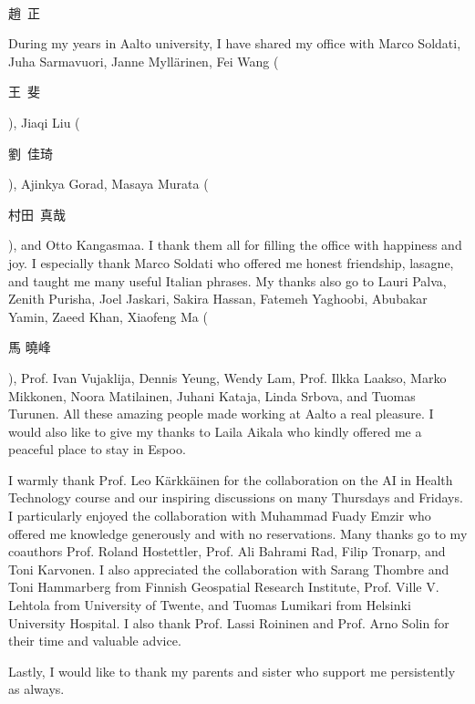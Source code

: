 \begin{preface}[Helsinki]{\large{\begin{CJK}{UTF8}{bkai}\\趙~正\end{CJK}}
}
During my years in Aalto university, I have shared my office with Marco Soldati, Juha Sarmavuori, Janne Myll\"{a}rinen, Fei Wang (\begin{CJK}{UTF8}{bkai}王~斐\end{CJK}), Jiaqi Liu (\begin{CJK}{UTF8}{bkai}劉~佳琦\end{CJK}), Ajinkya Gorad, Masaya Murata (\begin{CJK}{UTF8}{bkai}村田~真哉\end{CJK}), and Otto Kangasmaa. I thank them all for filling the office with happiness and joy. I especially thank Marco Soldati who offered me honest friendship, lasagne, and taught me many useful Italian phrases. My thanks also go to Lauri Palva, Zenith Purisha, Joel Jaskari, Sakira Hassan, Fatemeh Yaghoobi, Abubakar Yamin, Zaeed Khan, Xiaofeng Ma (\begin{CJK}{UTF8}{bkai}馬 曉峰\end{CJK}), Prof. Ivan Vujaklija, Dennis Yeung, Wendy Lam, Prof. Ilkka Laakso, Marko Mikkonen, Noora Matilainen, Juhani Kataja, Linda Srbova, and Tuomas Turunen. All these amazing people made working at Aalto a real pleasure. I would also like to give my thanks to Laila Aikala who kindly offered me a peaceful place to stay in Espoo.

I warmly thank Prof. Leo K\"{a}rkk\"{a}inen for the collaboration on the AI in Health Technology course and our inspiring discussions on many Thursdays and Fridays. I particularly enjoyed the collaboration with Muhammad Fuady Emzir who offered me knowledge generously and with no reservations. Many thanks go to my coauthors Prof. Roland Hostettler, Prof. Ali Bahrami Rad, Filip Tronarp, and Toni Karvonen. I also appreciated the collaboration with Sarang Thombre and Toni Hammarberg from Finnish Geospatial Research Institute, Prof. Ville V. Lehtola from University of Twente, and Tuomas Lumikari from Helsinki University Hospital. I also thank Prof. Lassi Roininen and Prof. Arno Solin for their time and valuable advice. 

Lastly, I would like to thank my parents and sister who support me persistently as always. 

\end{preface}

\clearpage
\tableofcontents


